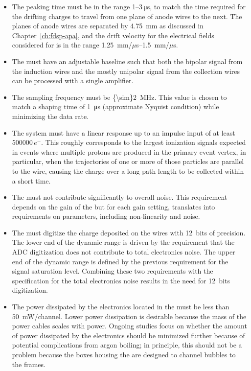 \begin{itemize}
\item{The  peaking time must be in the range \numrange{1}{3}\,\si{\micro\second},
to match the time required for the drifting charges to travel from one plane of anode
wires to the next. The planes of anode wires are separated by \SI{4.75}{mm}
as discussed in Chapter~\ref{ch:fdsp-apa}, and the drift velocity for
the electrical fields considered for  is in the range
\SIrange{1.25}{1.5}{mm/$\mu$s}.}
\item{The  must have an adjustable baseline such that both the
bipolar signal from the induction wires and the mostly unipolar signal 
from the collection wires can be processed with a single amplifier.}
\item{The  sampling frequency must be \SI{{\sim}2}{MHz}. 
This value is chosen to match a  shaping time of \SI{1}{\micro\second} 
(approximate Nyquist condition) while minimizing the data rate.}
\item{The system must have a linear response up to an impulse input of 
at least \num{500000}\,$e^{-}$.  This roughly corresponds to the largest 
ionization signals expected in events where multiple protons are produced 
in the primary event vertex, in particular, when the trajectories of one 
or more of those particles are parallel to the wire, causing the charge 
over a long path length to be collected within a short time.}
\item{The  must not contribute significantly to overall 
 noise. This requirement depends on the gain of the  
but for each gain setting, translates into requirements on  
parameters, including non-linearity and noise.}
\item{The  must digitize the charge deposited on the wires 
with 12~bits of precision.  The lower end of the  dynamic 
range is driven by the requirement that the ADC digitization does not 
contribute to total electronics noise. The upper end of the  
dynamic range is defined by the previous requirement for the signal 
saturation level. Combining these two requirements with the specification 
for the total electronics noise results in the need for 12~bits digitization.}
\item{The power dissipated by the electronics located in the  must
be less than \SI{50}{mW/channel}.  Lower power dissipation is desirable 
because the mass of the power cables scales with  power. Ongoing studies 
focus on whether the amount of power dissipated by the electronics 
should be minimized further because of potential complications from 
argon boiling; in principle, this should not be a problem because the 
 boxes housing the  are designed to channel 
bubbles to the  frames.}
\end{itemize}

